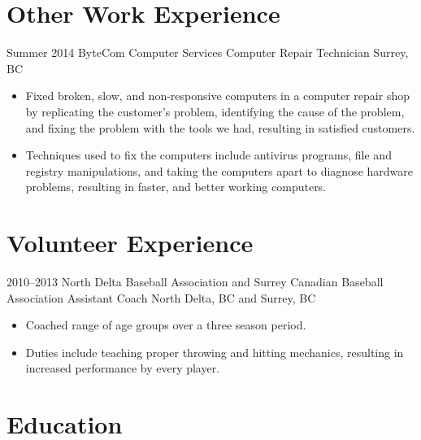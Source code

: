\documentclass[]{friggeri-cv} %
\begin{document}
\section{Other Work Experience}

\begin{entrylist}

\entry
{Summer 2014}
{ByteCom Computer Services {\normalfont Computer Repair Technician}}
{Surrey, BC}
{
\begin{itemize}
\item Fixed broken, slow, and non-responsive computers in a computer repair shop
by replicating the customer’s problem, identifying the cause of the problem, and
fixing the problem with the tools we had, resulting in satisfied customers.
\item Techniques used to fix the computers include antivirus programs, file and
registry manipulations, and taking the computers apart to diagnose hardware
problems, resulting in faster, and better working computers.
\end{itemize}
}

\end{entrylist}

\section{Volunteer Experience}

\begin{entrylist}

\entry
{2010--2013}
{North Delta Baseball Association and Surrey Canadian Baseball Association {\normalfont Assistant Coach}}
{North Delta, BC and Surrey, BC}
{
\begin{itemize}
\item Coached range of age groups over a three season period.
\item Duties include teaching proper throwing and hitting mechanics, resulting
  in increased performance by every player.
\end{itemize}
}
\end{entrylist}


\section{Education}
\end{document}
